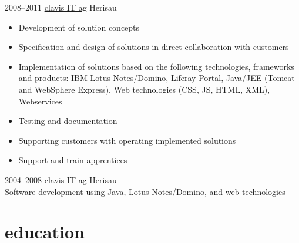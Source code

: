 \documentclass[]{cv-style}
\begin{document}
\begin{entrylist}
\entry
  {2008--2011}
  {\href{https://www.clavisit.com/}{clavis IT ag}}
  {Herisau}
  {
  \begin{itemize}
  	\item Development of solution concepts
  	\item Specification and design of solutions in direct collaboration with customers
  	\item Implementation of solutions based on the following technologies, frameworks and products: IBM Lotus Notes/Domino, Liferay Portal, Java/JEE (Tomcat and WebSphere Express), Web technologies (CSS, JS, HTML, XML), Webservices
  	\item Testing and documentation
  	\item Supporting customers with operating implemented solutions
  	\item Support and train apprentices
  \end{itemize}}
\entry
  {2004--2008}
  {\href{https://www.clavisit.com/}{clavis IT ag}}
  {Herisau}
  {\\
  Software development using Java, Lotus Notes/Domino, and web technologies}
\end{entrylist}


\section{education}
\end{document}
